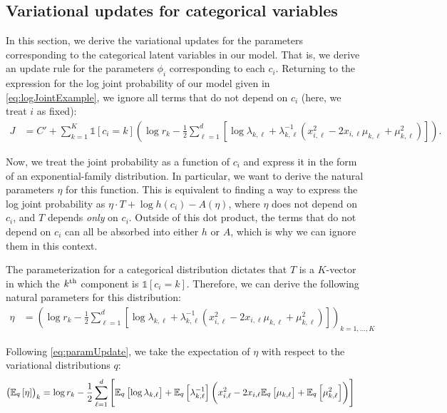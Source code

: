 \documentclass[11pt]{article}
\begin{document}
\subsection{Variational updates for categorical variables}

In this section, we derive the variational updates for the parameters corresponding to the categorical latent variables in our model.
That is, we derive an update rule for the parameters $\phi_i$ corresponding to each $c_i$.
Returning to the expression for the log joint probability of our model given in \eqref{eq:logJointExample}, we ignore all terms that do not depend on $c_i$ (here, we treat $i$ as fixed):
\begin{align}
J
&= C' + \sum_{k=1}^K \mathds{1}[c_i = k] \left( \log r_k - \frac{1}{2}
        \sum_{\ell=1}^d \left[ \log \lambda_{k,\ell} + \lambda_{k,\ell}^{-1} \left( x_{i,\ell}^2 - 2 x_{i,\ell} \mu_{k,\ell} + \mu_{k,\ell}^2 \right) \right]
    \right).
\end{align}

Now, we treat the joint probability as a function of $c_i$ and express it in the form of an exponential-family distribution.
In particular, we want to derive the natural parameters $\eta$ for this function.
This is equivalent to finding a way to express the log joint probability as $\eta \cdot T + \log h(c_i) - A(\eta)$, where $\eta$ does not depend on $c_i$, and $T$ depends \emph{only} on $c_i$.
Outside of this dot product, the terms that do not depend on $c_i$ can all be absorbed into either $h$ or $A$, which is why we can ignore them in this context.

The parameterization for a categorical distribution dictates that $T$ is a $K$-vector in which the $k^{\mathrm{th}}$ component is $\mathds{1}[c_i = k]$.
Therefore, we can derive the following natural parameters for this distribution:
\begin{align}
\eta &= \left(
    \log r_k - \frac{1}{2} \sum_{\ell=1}^d \left[ \log \lambda_{k,\ell} + \lambda_{k,\ell}^{-1} \left( x_{i,\ell}^2 - 2 x_{i,\ell} \mu_{k,\ell} + \mu_{k,\ell}^2 \right) \right]
\right)_{k = 1, \ldots, K}
\end{align}

Following \eqref{eq:paramUpdate}, we take the expectation of $\eta$ with respect to the variational distributions $q$:
\begin{align}
\left( \mathbb{E}_{\substack{q}}\left[ \eta \right] \right)_k
&=
\log r_k - \frac{1}{2} \sum_{\ell=1}^d \left[ \mathbb{E}_{\substack{q}}\left[ \log \lambda_{k,\ell} \right] + \mathbb{E}_{\substack{q}}\left[ \lambda_{k,\ell}^{-1} \right] \left( x_{i,\ell}^2 - 2 x_{i,\ell} \mathbb{E}_{\substack{q}}\left[ \mu_{k,\ell} \right] + \mathbb{E}_{\substack{q}}\left[ \mu_{k,\ell}^2 \right] \right) \right]
\end{align}
\end{document}
